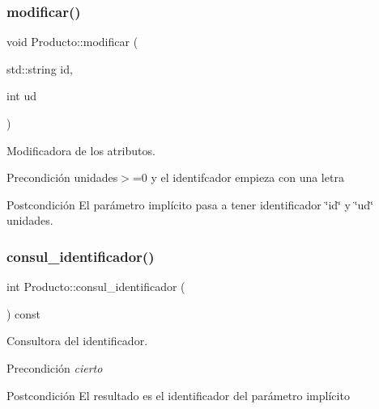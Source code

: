 \subsubsection{\texorpdfstring{modificar()}{modificar()}}
{\footnotesize\ttfamily void Producto\+::modificar (\begin{DoxyParamCaption}\item[{std\+::string}]{id,  }\item[{int}]{ud }\end{DoxyParamCaption})}



Modificadora de los atributos. 

\begin{DoxyPrecond}{Precondición}
unidades$>$=0 y el identifcador empieza con una letra 
\end{DoxyPrecond}
\begin{DoxyPostcond}{Postcondición}
El parámetro implícito pasa a tener identificador \char`\"{}id\char`\"{} y \char`\"{}ud\char`\"{} unidades. 
\end{DoxyPostcond}
\mbox{\label{class_producto_ae0067962ae16d3c12fb6dda463562245}} 
\subsubsection{\texorpdfstring{consul\+\_\+identificador()}{consul\_identificador()}}
{\footnotesize\ttfamily int Producto\+::consul\+\_\+identificador (\begin{DoxyParamCaption}{ }\end{DoxyParamCaption}) const}



Consultora del identificador. 

\begin{DoxyPrecond}{Precondición}
{\itshape cierto} 
\end{DoxyPrecond}
\begin{DoxyPostcond}{Postcondición}
El resultado es el identificador del parámetro implícito 
\end{DoxyPostcond}
\mbox{\label{class_producto_aa26e89579230adf0e1e40460a04ff36f}} 

